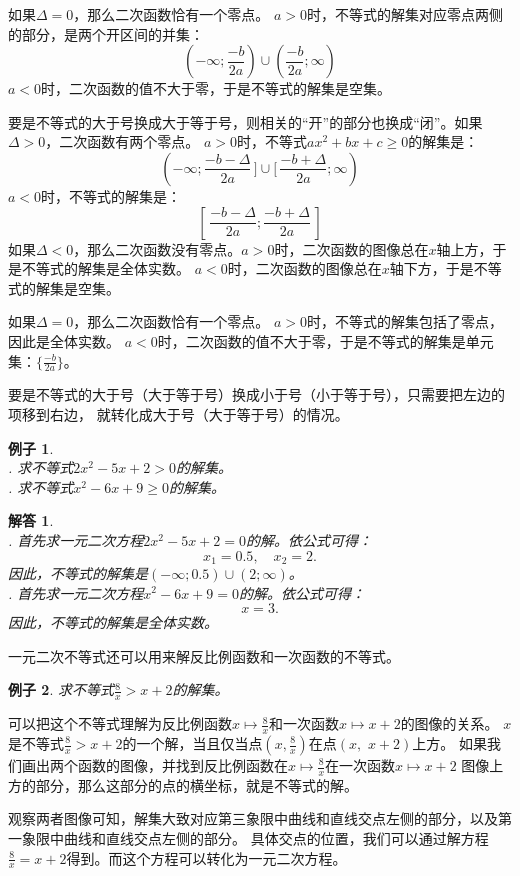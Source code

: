 \documentclass[12pt,UTF8]{ctexbook}
\newtheorem{ex}{例子}[section]
\newtheorem*{so}{解答}
\begin{document}
如果$\Delta = 0$，那么二次函数恰有一个零点。
$a>0$时，不等式的解集对应零点两侧的部分，是两个开区间的并集：
$$ (-\infty; \frac{-b}{2a}) \cup (\frac{-b}{2a}; \infty)$$
$a<0$时，二次函数的值不大于零，于是不等式的解集是空集。

要是不等式的大于号换成大于等于号，则相关的“开”的部分也换成“闭”。如果$\Delta>0$，二次函数有两个零点。
$a>0$时，不等式$ax^2 + bx + c \geqslant 0$的解集是：
$$ (-\infty; \frac{-b - \Delta}{2a}\,] \cup [\,\frac{-b +\Delta}{2a}; \infty)$$
$a<0$时，不等式的解集是：
$$ [\,\frac{-b - \Delta}{2a}; \frac{-b +\Delta}{2a}\,] $$
如果$\Delta<0$，那么二次函数没有零点。$a>0$时，二次函数的图像总在$x$轴上方，于是不等式的解集是全体实数。
$a<0$时，二次函数的图像总在$x$轴下方，于是不等式的解集是空集。

如果$\Delta = 0$，那么二次函数恰有一个零点。
$a>0$时，不等式的解集包括了零点，因此是全体实数。
$a<0$时，二次函数的值不大于零，于是不等式的解集是单元集：$\{\frac{-b}{2a}\}$。

要是不等式的大于号（大于等于号）换成小于号（小于等于号），只需要把左边的项移到右边，
就转化成大于号（大于等于号）的情况。

\begin{ex}
    \mbox{}\\
    . 求不等式$2x^2 - 5x + 2 > 0$的解集。\\
    . 求不等式$x^2 - 6x + 9 \geqslant 0$的解集。
\end{ex}
\begin{so}
    \mbox{}\\
    . 首先求一元二次方程$2x^2 - 5x + 2 = 0$的解。依公式可得：
    $$ x_1 = 0.5, \quad x_2 = 2.$$
    因此，不等式的解集是$(-\infty; 0.5) \cup (2; \infty)$。\\
    . 首先求一元二次方程$x^2 - 6x + 9 = 0$的解。依公式可得：
    $$ x = 3.$$
    因此，不等式的解集是全体实数。
\end{so}

一元二次不等式还可以用来解反比例函数和一次函数的不等式。
\begin{ex}
    求不等式$\frac{8}{x} > x + 2$的解集。
\end{ex}
可以把这个不等式理解为反比例函数$x \mapsto \frac{8}{x}$和一次函数$x \mapsto x + 2$的图像的关系。
$x$是不等式$\frac{8}{x} > x + 2$的一个解，当且仅当点$(x, \frac{8}{x})$在点$(x, \,\,x + 2)$上方。
如果我们画出两个函数的图像，并找到反比例函数在$x \mapsto \frac{8}{x}$在一次函数$x \mapsto x + 2$
图像上方的部分，那么这部分的点的横坐标，就是不等式的解。

观察两者图像可知，解集大致对应第三象限中曲线和直线交点左侧的部分，以及第一象限中曲线和直线交点左侧的部分。
具体交点的位置，我们可以通过解方程$\frac{8}{x} = x + 2$得到。而这个方程可以转化为一元二次方程。
\end{document}
